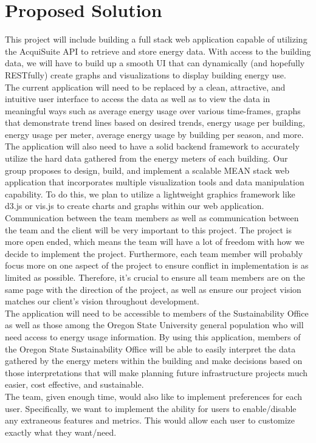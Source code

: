 \documentclass[onecolumn, draftclsnofoot,10pt, compsoc]{IEEEtran}
\begin{document}
    \section{Proposed Solution}
    This project will include building a full stack web application capable of utilizing the AcquiSuite API to retrieve and store energy data. With access to the building data, we will have to build up a smooth UI that can dynamically (and hopefully RESTfully) create graphs and visualizations to display building energy use.\\
    \indent The current application will need to be replaced by a clean, attractive, and intuitive user interface to access the data as well as to view the data in meaningful ways such as average energy usage over various time-frames, graphs that demonstrate trend lines based on desired trends, energy usage per building, energy usage per meter, average energy usage by building per season, and more. The application will also need to have a solid backend framework to accurately utilize the hard data gathered from the energy meters of each building. Our group proposes to design, build, and implement a scalable MEAN stack web application that incorporates multiple visualization tools and data manipulation capability. To do this, we plan to utilize a lightweight graphics framework like d3.js or vis.js to create charts and graphs within our web application.\\
    \indent Communication between the team members as well as communication between the team and the client will be very important to this project. The project is more open ended, which means the team will have a lot of freedom with how we decide to implement the project. Furthermore, each team member will probably focus more on one aspect of the project to ensure conflict in implementation is as limited as possible.  Therefore, it’s crucial to ensure all team members are on the same page with the direction of the project, as well as ensure our project vision matches our client's vision throughout development.\\    
    \indent The application will need to be accessible to members of the Sustainability Office as well as those among the Oregon State University general population who will need access to energy usage information. By using this application, members of the Oregon State Sustainability Office will be able to easily interpret the data gathered by the energy meters within the building and make decisions based on those interpretations that will make planning future infrastructure projects much easier, cost effective, and sustainable.\\
    \indent The team, given enough time, would also like to implement preferences for each user. Specifically, we want to implement the ability for users to enable/disable any extraneous features and metrics. This would allow each user to customize exactly what they want/need.
    \newpage
\end{document}
